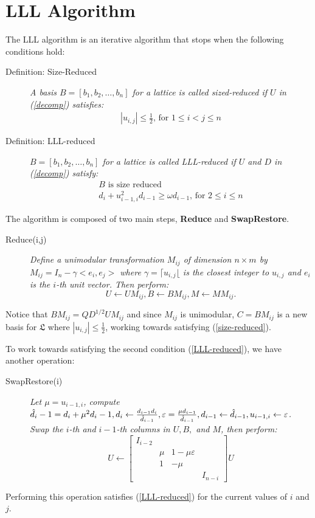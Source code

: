 \documentclass[12pt]{article}
\numberwithin{equation}{section}
\numberwithin{table}{section}
\numberwithin{figure}{section}
\begin{document}
\section{LLL Algorithm}
The LLL algorithm is an iterative algorithm that stops when the following conditions hold:
\begin{description}
\item[Definition: Size-Reduced]\textit{ A basis $B=[b_1,b_2,\ldots,b_n]$ for a lattice is called sized-reduced if $U$ in (\ref{decomp}) satisfies:}
\begin{eqnarray}
|u_{i,j}|\leq\frac{1}{2}\text{, for }1\leq i < j \leq n \label{size-reduced}
\end{eqnarray}
\item[Definition: LLL-reduced] \textit{$B=[b_1,b_2,\ldots,b_n]$ for a lattice is called LLL-reduced if $U$ and $D$ in (\ref{decomp}) satisfy:}
\begin{eqnarray}
B\text{ is size reduced}\\
d_i+u^2_{i-1,i}d_{i-1}\geq \omega d_{i-1}\text{, for }2 \leq i \leq n \label{LLL-reduced}
\end{eqnarray}
\end{description}
The algorithm is composed of two main steps, \textbf{Reduce} and \textbf{SwapRestore}.
\begin{description}
\item[Reduce(i,j)] \textit{Define a unimodular transformation $M_{ij}$ of dimension $n\times m$ by 
\\$M_{ij}=I_n-\gamma <e_i, e_j>$ where $\gamma=\lceil u_{i,j} \lfloor$ is the closest integer to $u_{i,j}$ and $e_i$ is the $i$-th unit vector. Then perform:}
$$U\leftarrow UM_{ij}, B\leftarrow BM_{ij}, M\leftarrow MM_{ij}.$$
\end{description}
Notice that $BM_{ij}=QD^{1/2}UM_{ij}$ and since $M_{ij}$ is unimodular, $C=BM_{ij}$ is a new basis for $\mathfrak{L}$ where $|u_{i,j}|\leq \frac{1}{2}$, working towards satisfying (\ref{size-reduced}).

To work towards satisfying the second condition (\ref{LLL-reduced}), we have another operation:
\begin{description}
\item[SwapRestore(i)] \textit{Let $\mu=u_{i-1,i}$, compute $\hat{d}_i-1=d_i+\mu^2 d_i-1, d_i\leftarrow \frac{d_{i-1}d_i}{\hat{d}_{i-1}},
\\\varepsilon=\frac{\mu d_{i-1}}{\hat{d}_{i-1}},d_{i-1}\leftarrow \hat{d}_{i-1}, u_{i-1,i}\leftarrow \varepsilon$. Swap the $i$-th and $i-1$-th columns in $U,B,$ and $M$, then perform:}
$$U \leftarrow \left[
\begin{array}{cccc}
I_{i-2} & & &\\
&\mu & 1-\mu \varepsilon &\\
&1   &  -\mu &\\
& & & I_{n-i}
\end{array}\right]U $$
\end{description}
Performing this operation satisfies (\ref{LLL-reduced}) for the current values of $i$ and $j$.
\end{document}
